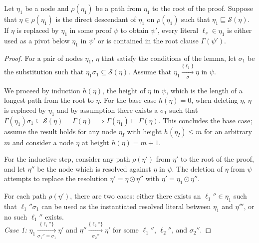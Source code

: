 \begin{lem}\label{lem:cor}
Let $\eta_1$ be a node and $\rho(\eta_1)$ be a path from $\eta_1$ to the root of the proof. Suppose that $\eta \in \rho(\eta_1)$ is the direct descendant of $\eta_1$ on $\rho(\eta_1)$ such that $\eta_1 \sqsubseteq \mathcal{S}(\eta)$. If $\eta$ is replaced by $\eta_1$ in some proof $\psi$ to obtain $\psi'$, every literal $\ell_s \in \eta_1$ is either used as a pivot below $\eta_1$ in $\psi'$ or is contained in the root clause $\Gamma(\psi')$. \\
\end{lem}

\begin{proof}
For a pair of nodes $\eta_1$, $\eta$ that satisfy the conditions of the lemma, let $\sigma_1$ be the substitution such that $\eta_1\sigma_1 \subseteq \mathcal{S}(\eta)$. Assume that $\eta_1 \xrightarrow[\sigma]{\{\ell_1\} } \eta$ in $\psi$.

We proceed by induction $h(\eta)$, the height of $\eta$ in $\psi$, which is the length of a longest path from the root to $\eta$. For the base case $h(\eta)=0$, when deleting $\eta$, $\eta$ is replaced by $\eta_1$ and by assumption there exists a $\sigma_1$ such that $\Gamma(\eta_1)\sigma_1 \subseteq \mathcal{S}(\eta) = \Gamma(\eta) \implies \Gamma(\eta_1) \sqsubseteq \Gamma(\eta)$. %
This concludes the base case; assume the result holds for any node $\eta_I$ with height $h(\eta_I) \le m$ for an arbitrary $m$ and consider a node $\eta$ at height $h(\eta)=m+1$.

For the inductive step, 
consider any path $\rho(\eta')$ from $\eta'$ to the root of the proof, and let $\eta''$ be the node which is resolved against $\eta$ in $\psi$. The deletion of $\eta$ from $\psi$ attempts to replace the resolution $\eta'=\eta \odot \eta''$ with $\eta' = \eta_1 \odot \eta''$.

For each path $\rho(\eta')$, there are two cases: either there exists an $\ell_1''\in \eta_1$ such that $\ell_1''\sigma_1$ can be used as the instantiated resolved literal between $\eta_1$ and $\eta'''$, or no such $\ell_1''$ exists.\\

\noindent
\emph{Case 1:}  $\eta_1 \xrightarrow[\sigma_1''=\sigma_1]{\{\ell_1''\} } \eta'$ and $\eta'' \xrightarrow[\sigma_2'']{\{\ell_2''\} } \eta'$ for some $\ell_1''$, $\ell_2''$, and $\sigma_2''$.


\end{proof}
